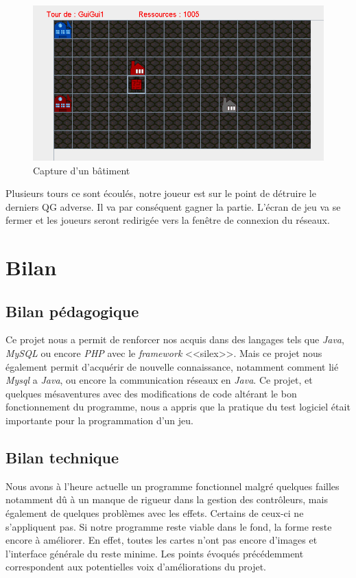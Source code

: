 \documentclass[a4paper, titlepage]{livret}
\begin{document}
	 

	

	
	 \begin{figure}[th]
	\begin{center}
	\includegraphics[scale=0.5]{Assets/CaptureSucces.png} 
	\caption{Capture d'un bâtiment}
     \label{CaptureBatiment}
      \end{center}
    \end{figure}
	
	 Plusieurs tours ce sont écoulés, notre joueur est sur le point de détruire le derniers QG adverse. Il va par conséquent gagner la partie. L'écran de jeu va se fermer et les joueurs seront redirigée vers la fenêtre de connexion du réseaux.
	

  
  \chapter{Bilan}
    \section{Bilan pédagogique}
      Ce projet nous a permit de renforcer nos acquis dans des langages tels que \textit{Java}, \textit{MySQL} ou encore \textit{PHP} avec le \textit{framework} <<silex>>. Mais ce projet nous également permit d'acquérir de nouvelle connaissance, notamment comment lié \textit{Mysql} a \textit{Java}, ou encore la communication réseaux en \textit{Java}. Ce projet, et quelques mésaventures avec des modifications de code altérant le bon fonctionnement du programme, nous a appris que la pratique du test logiciel était importante pour la programmation d'un jeu.
      
    \section{Bilan technique}
       Nous avons à l'heure actuelle un programme fonctionnel malgré quelques failles notamment dû à un manque de rigueur dans la gestion des contrôleurs, mais également de quelques problèmes avec les effets. Certains de ceux-ci ne s'appliquent pas. Si notre programme reste viable dans le fond, la forme reste encore à améliorer. En effet, toutes les cartes n'ont pas encore d'images et l'interface générale du reste minime. Les points évoqués précédemment correspondent aux potentielles voix d'améliorations du projet.
       
\end{document}
